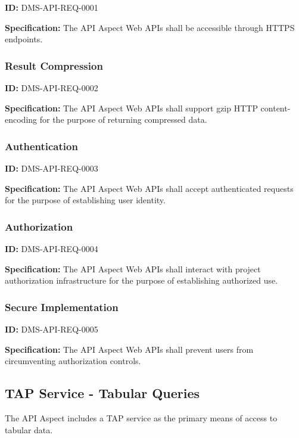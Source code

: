 \documentclass[SE,toc,lsstdraft]{lsstdoc}
\begin{document}
\label{DMS-API-REQ-0001}
\textbf{ID:} DMS-API-REQ-0001

\textbf{Specification:}
The API Aspect Web APIs shall be accessible through HTTPS endpoints.

\subsubsection{Result Compression}

\label{DMS-API-REQ-0002}
\textbf{ID:} DMS-API-REQ-0002

\textbf{Specification:}
The API Aspect Web APIs shall support gzip HTTP content-encoding for the purpose of returning compressed data.

\subsubsection{Authentication}

\label{DMS-API-REQ-0003}
\textbf{ID:} DMS-API-REQ-0003

\textbf{Specification:}
The API Aspect Web APIs shall accept authenticated requests for the purpose of establishing user identity.

\subsubsection{Authorization}

\label{DMS-API-REQ-0004}
\textbf{ID:} DMS-API-REQ-0004

\textbf{Specification:}
The API Aspect Web APIs shall interact with project authorization infrastructure for the purpose of establishing authorized use.

\subsubsection{Secure Implementation}

\label{DMS-API-REQ-0005}
\textbf{ID:} DMS-API-REQ-0005

\textbf{Specification:}
The API Aspect Web APIs shall prevent users from circumventing authorization controls.

\subsection{TAP Service - Tabular Queries}

The API Aspect includes a TAP service as the primary means of access to tabular data.
\end{document}
